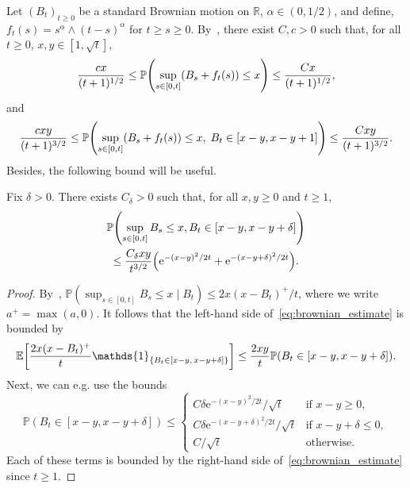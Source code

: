 \documentclass[AHL,Unicode,longabstracts,published]{cedram}
\newcommand{\e}{\mathrm{e}}
\renewcommand{\P}{\mathbb{P}}
\newcommand{\R}{\mathbb{R}}
\newcommand\1{\mathds{1}}
\newcommand{\Expec}[1]{\mathbb{E}\left[#1\right]}
\let\originalleft\left
\let\originalright\right
\renewcommand{\left}{\mathopen{}\mathclose\bgroup\originalleft}
\renewcommand{\right}{\aftergroup\egroup\originalright}
\begin{document}
Let $(B_t)_{t \geq 0}$ be a standard Brownian motion on $\R$, $\alpha \in (0, 1/2)$, and define, $f_t(s) = s^\alpha \wedge (t - s)^\alpha$ for $t \geq s \geq 0$. By~\cite[Lemma~2.8]{KimLubetzkyZeitouni2023}, there exist $C, c > 0$ such that, for all $t \geq 0$, $x, y \in [1, \sqrt{t}]$,
\begin{equation}\label{eq:ballot_theorem}
\frac{c x}{(t + 1)^{1/2}} \leq \P \left(\sup_{s \in [0, t]} (B_s + f_t(s)) \leq x \right) \leq \frac{C x}{(t + 1)^{1/2}},
\end{equation}
and
\begin{equation}\label{eq:ballot_theorem_plus}
\frac{c x y}{(t + 1)^{3/2}} \leq \P \left(\sup_{s \in [0, t]} (B_s + f_t(s)) \leq x,\; B_t \in [x - y, x - y + 1] \right) \leq \frac{C x y}{(t + 1)^{3/2}}.
\end{equation}
Besides, the following bound will be useful.

\begin{lemm}\label{lem:brownian_estimate}
Fix $\delta > 0$. There exists $C_\delta > 0$ such that, for all $x, y \geq 0$ and $t \geq 1$,
\begin{multline}\label{eq:brownian_estimate}
\P \left(\sup_{s \in [0, t]} B_s \leq x, B_t \in [x - y, x - y + \delta] \right) \\
\leq \frac{C_\delta x y}{t^{3/2}} \left(\e^{-(x - y)^2/2t} + \e^{-(x - y + \delta)^2/2t} \right).
\end{multline}
\end{lemm}

\begin{proof}
By~\cite[Lemma~2]{Bramson1978}, $\P (\sup_{s \in [0, t]} B_s \leq x \mid B_t) \leq 2 x (x - B_t)^+/t$, where we write $a^+ = \max(a, 0)$. It follows that the left-hand side of~\eqref{eq:brownian_estimate} is bounded by
\begin{equation*}
\Expec{\frac{2 x (x - B_t)^+}{t} \1_{\{B_t \in [x - y,\, x - y + \delta]\}}} \leq \frac{2 x y}{t} \P(B_t \in [x - y, x - y + \delta]).
\end{equation*}
Next, we can e.g. use the bounds
\begin{equation*}
\P(B_t \in [x - y, x - y + \delta]) \leq
\begin{cases}
C \delta \e^{-(x - y)^2/2t}/\sqrt{t} & \text{if } x - y \geq 0, \\
C \delta \e^{-(x - y + \delta)^2/2t}/\sqrt{t} & \text{if } x - y + \delta \leq 0, \\
C/\sqrt{t} & \text{otherwise}.
\end{cases}
\end{equation*}
Each of these terms is bounded by the right-hand side of~\eqref{eq:brownian_estimate} since $t \geq 1$.
\end{proof}
\end{document}
